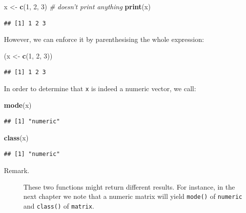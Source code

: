 \documentclass[10pt,b5paper,krantz1]{krantz}
\newenvironment{Shaded}{\begin{snugshade}}{\end{snugshade}}
\newcommand{\CommentTok}[1]{\textcolor[rgb]{0.37,0.37,0.37}{\textit{#1}}}
\newcommand{\DecValTok}[1]{\textcolor[rgb]{0.06,0.06,0.06}{#1}}
\newcommand{\KeywordTok}[1]{\textcolor[rgb]{0.27,0.27,0.27}{\textbf{#1}}}
\newcommand{\NormalTok}[1]{#1}
\newcommand{\StringTok}[1]{\textcolor[rgb]{0.5,0.5,0.5}{#1}}
\begin{document}
\begin{Shaded}
\begin{Highlighting}[]
\NormalTok{x <-}\StringTok{ }\KeywordTok{c}\NormalTok{(}\DecValTok{1}\NormalTok{, }\DecValTok{2}\NormalTok{, }\DecValTok{3}\NormalTok{) }\CommentTok{# doesn't print anything}
\KeywordTok{print}\NormalTok{(x)}
\end{Highlighting}
\end{Shaded}

\begin{verbatim}
## [1] 1 2 3
\end{verbatim}

However, we can enforce it by parenthesising the whole expression:

\begin{Shaded}
\begin{Highlighting}[]
\NormalTok{(x <-}\StringTok{ }\KeywordTok{c}\NormalTok{(}\DecValTok{1}\NormalTok{, }\DecValTok{2}\NormalTok{, }\DecValTok{3}\NormalTok{))}
\end{Highlighting}
\end{Shaded}

\begin{verbatim}
## [1] 1 2 3
\end{verbatim}

In order to determine that \texttt{x} is indeed a numeric vector,
we call:

\begin{Shaded}
\begin{Highlighting}[]
\KeywordTok{mode}\NormalTok{(x)}
\end{Highlighting}
\end{Shaded}

\begin{verbatim}
## [1] "numeric"
\end{verbatim}

\begin{Shaded}
\begin{Highlighting}[]
\KeywordTok{class}\NormalTok{(x)}
\end{Highlighting}
\end{Shaded}

\begin{verbatim}
## [1] "numeric"
\end{verbatim}

\begin{description}
\item[Remark.]
These two functions might return different results.
For instance, in the next chapter we note that
a numeric matrix will yield \texttt{mode()} of \texttt{numeric} and
\texttt{class()} of \texttt{matrix}.
\end{description}
\end{document}
